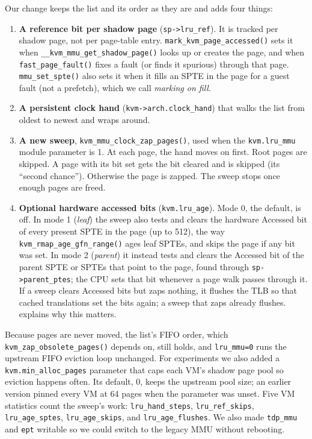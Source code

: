 \documentclass[letterpaper,twocolumn,10pt]{article}
\begin{document}
Our change keeps the list and its order as they are and adds four things:
\begin{enumerate}[leftmargin=*,itemsep=2pt,topsep=2pt]
    \item \textbf{A reference bit per shadow page} (\texttt{sp->lru\_ref}). It
          is tracked per shadow page, not per page-table entry.
          \texttt{mark\_kvm\_page\_accessed()} sets it when
          \texttt{\_\_kvm\_mmu\_get\_shadow\_page()} looks up or creates the page,
          and when \texttt{fast\_page\_fault()} fixes a fault (or finds it
          spurious) through that page. \texttt{mmu\_set\_spte()} also sets it
          when it fills an SPTE in the page for a guest fault (not a
          prefetch), which we call \emph{marking on fill}.
    \item \textbf{A persistent clock hand} (\texttt{kvm->arch.clock\_hand}) that
          walks the list from oldest to newest and wraps around.
    \item \textbf{A new sweep}, \texttt{kvm\_mmu\_clock\_zap\_pages()}, used when
          the \texttt{kvm.lru\_mmu} module parameter is 1. At each page, the hand
          moves on first. Root pages are skipped. A page with its bit set gets
          the bit cleared and is skipped (its ``second chance''). Otherwise the
          page is zapped. The sweep stops once enough pages are freed.
    \item \textbf{Optional hardware accessed bits} (\texttt{kvm.lru\_age}).
          Mode 0, the default, is off. In mode 1 (\emph{leaf}) the sweep also
          tests and clears the hardware Accessed bit of every present SPTE in
          the page (up to 512), the way \texttt{kvm\_rmap\_age\_gfn\_range()}
          ages leaf SPTEs, and skips the page if any bit was set. In mode 2
          (\emph{parent}) it instead tests and clears the Accessed bit of the
          parent SPTE or SPTEs that point to the page, found through
          \texttt{sp->parent\_ptes}; the CPU sets that bit whenever a page walk
          passes through it. If a sweep clears Accessed bits but zaps nothing, it
          flushes the TLB so that cached translations set the bits again; a
          sweep that zaps already flushes.  explains why this
          matters.
\end{enumerate}
Because pages are never moved, the list's FIFO order, which
\texttt{kvm\_zap\_obsolete\_pages()} depends on, still holds, and
\texttt{lru\_mmu=0} runs the upstream FIFO eviction loop unchanged. For experiments we also
added a \texttt{kvm.min\_alloc\_pages} parameter that caps each VM's shadow page
pool so eviction happens often. Its default, 0, keeps the upstream pool size; an
earlier version pinned every VM at 64 pages when the parameter was unset. Five
VM statistics count the sweep's work: \texttt{lru\_hand\_steps},
\texttt{lru\_ref\_skips}, \texttt{lru\_age\_sptes}, \texttt{lru\_age\_skips},
and \texttt{lru\_age\_flushes}. We also made \texttt{tdp\_mmu} and \texttt{ept}
writable so we could switch to the legacy MMU without rebooting.
\end{document}
